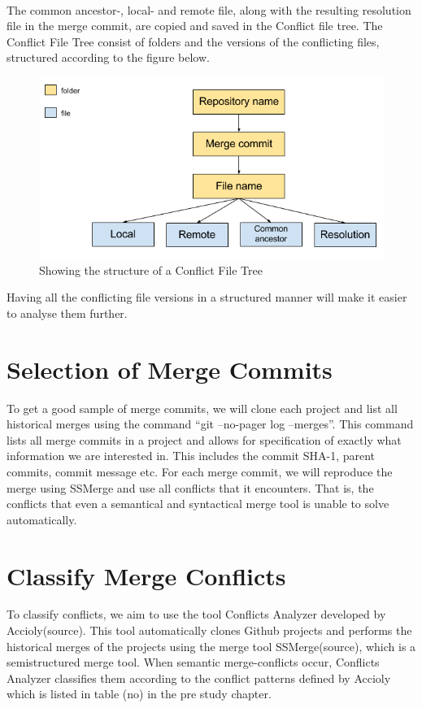 \paragraph*{}
The common ancestor-, local- and remote file, along with the resulting resolution file in the merge commit, are copied and saved in the Conflict file tree. The Conflict File Tree consist of folders and the versions of the conflicting files, structured according to the figure below.\\
\begin{figure}[H]
\centering
\includegraphics[width=400pt]{figure/conflicts.png}
\caption{Showing the structure of a Conflict File Tree}
\end{figure}

Having all the conflicting file versions in a structured manner will make it easier to analyse them further.

\section{Selection of Merge Commits}
To get a good sample of merge commits, we will clone each project and list all historical merges using the command “git --no-pager log --merges”. This command lists all merge commits in a project and allows for specification of exactly what information we are interested in. This includes the commit SHA-1, parent commits, commit message etc. For each merge commit, we will reproduce the merge using SSMerge and use all conflicts that it encounters. That is, the conflicts that even a semantical and syntactical merge tool is unable to solve automatically.
\section{Classify Merge Conflicts}
To classify conflicts, we aim to use the tool Conflicts Analyzer developed by Accioly(source). This tool automatically clones Github projects and performs the historical merges of the projects using the merge tool SSMerge(source), which is a semistructured merge tool. When semantic merge-conflicts occur, Conflicts Analyzer classifies them according to the conflict patterns defined by Accioly which is listed in table (no) in the pre study chapter.
